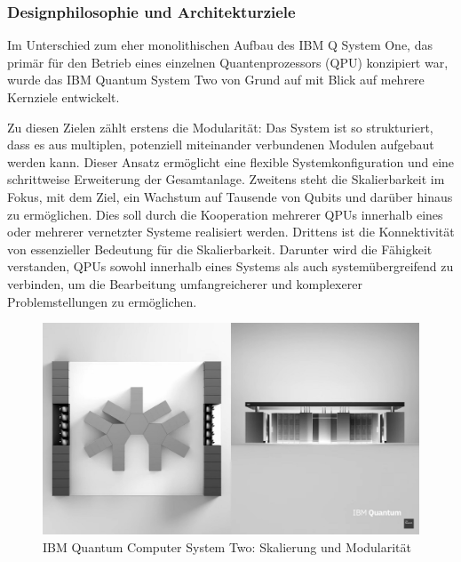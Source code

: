 
\subsubsection{Designphilosophie und Architekturziele}
Im Unterschied zum eher monolithischen Aufbau des IBM Q System One, das primär für den Betrieb eines einzelnen Quantenprozessors (QPU) konzipiert war, wurde das IBM Quantum System Two von Grund auf mit Blick auf mehrere Kernziele entwickelt. 

Zu diesen Zielen zählt erstens die Modularität: Das System ist so strukturiert, dass es aus multiplen, potenziell miteinander verbundenen Modulen aufgebaut werden kann. Dieser Ansatz ermöglicht eine flexible Systemkonfiguration und eine schrittweise Erweiterung der Gesamtanlage. 
Zweitens steht die Skalierbarkeit im Fokus, mit dem Ziel, ein Wachstum auf Tausende von Qubits und darüber hinaus zu ermöglichen. Dies soll durch die Kooperation mehrerer QPUs innerhalb eines oder mehrerer vernetzter Systeme realisiert werden. 
Drittens ist die Konnektivität von essenzieller Bedeutung für die Skalierbarkeit. Darunter wird die Fähigkeit verstanden, QPUs sowohl innerhalb eines Systems als auch systemübergreifend zu verbinden, um die Bearbeitung umfangreicherer und komplexerer Problemstellungen zu ermöglichen.

\begin{figure}[H]
    \centering
    \includegraphics[width=\textwidth]{images/quanten-hardware/IBM_Quantum_System_two_modular.jpg}
    \caption{IBM Quantum Computer System Two: Skalierung und Modularität}
    \label{fig:ibmquantumsystemtwomodular}
\end{figure}

